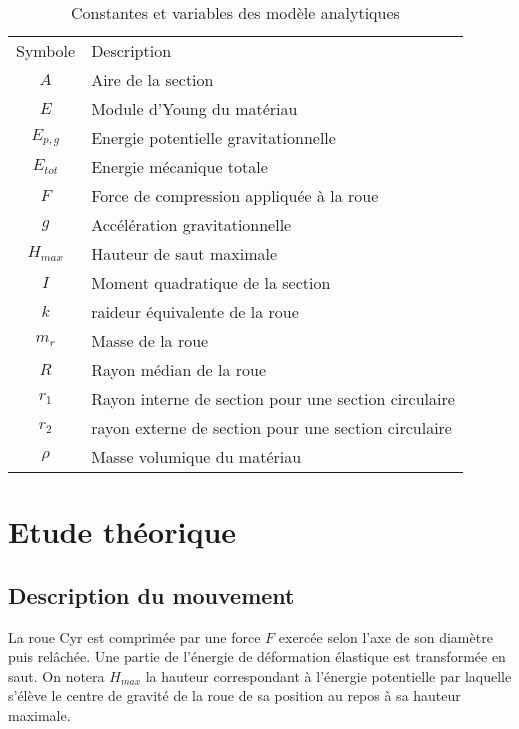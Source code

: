 \label{sec:Theme1}
\begin{table}[htbp]
  \centering
  \caption{Constantes et variables des modèle analytiques}
  \begin{tabular}{|c|l|}
    \hline \rowcolor[gray]{0.8}\color{black}
    Symbole         & Description\\
    $A$           & Aire de la section\\
   
    $E$           & Module d'Young du matériau\\
    $E_{p,g}$          & Energie potentielle gravitationnelle\\
    $E_{tot}$          & Energie mécanique totale\\
    $F$             & Force de compression appliquée à la roue\\
    $g$     & Accélération gravitationnelle\\
    $H_{max}$          & Hauteur de saut maximale\\
    $I$           & Moment quadratique de la section\\
    $k$             & raideur équivalente de la roue\\
    $m_r$          & Masse de la roue\\
    
    $R$       & Rayon médian de la roue\\
    $r_1$ & Rayon interne de section pour une section circulaire\\
    $r_2$             & rayon externe de section pour une section circulaire\\
    $\rho$           & Masse volumique du matériau\\ \hline
  \end{tabular}
  \label{tab:Definitions}
\end{table}


\section{Etude théorique}
\subsection{Description du mouvement}
La roue Cyr est comprimée par une force $F$ exercée selon l'axe de son diamètre puis relâchée. Une partie de l'énergie de déformation élastique est transformée en saut. On notera $H_{max}$ la hauteur correspondant à l'énergie potentielle par laquelle s'élève le centre de gravité de la roue de sa position au repos à sa hauteur maximale.


